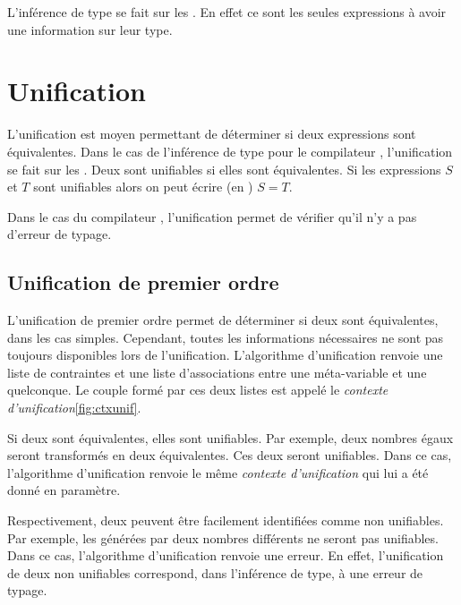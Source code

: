             L'inférence de type se fait sur les \lexp{}. En effet ce sont les seules expressions
            à avoir une information sur leur type.

    \section{Unification}
        L'unification est moyen permettant de déterminer si deux expressions sont équivalentes.
        Dans le cas de l'inférence de type pour le compilateur \typer{},
        l'unification se fait sur les \lexp{}.
        Deux \lexp{} sont unifiables si elles sont équivalentes. Si les expressions $S$ et $T$
        sont unifiables alors on peut écrire (en \typer{}) $S = T$.

        Dans le cas du compilateur \typer{}, l'unification permet de vérifier qu'il n'y a pas
        d'erreur de typage.

    \subsection{Unification de premier ordre}

                L'unification de premier ordre permet de déterminer si deux \lexp{} sont équivalentes, dans les cas simples.
                Cependant, toutes les informations nécessaires ne sont pas toujours disponibles lors de l'unification.
                L'algorithme d'unification renvoie une liste de contraintes et une liste d'associations entre une méta-variable et une \lexp{} quelconque.
                Le couple formé par ces deux listes est appelé le \textit{contexte d'unification}\ref{fig:ctxunif}.

                Si deux \lexp{} sont équivalentes, elles sont unifiables. Par exemple, deux nombres égaux seront transformés en deux \lexp{} équivalentes.
                Ces deux \lexp{} seront unifiables.
                Dans ce cas, l'algorithme d'unification renvoie le même \textit{contexte d'unification} qui lui a été donné en paramètre.

                Respectivement, deux \lexp{} peuvent être facilement identifiées comme non unifiables. Par exemple, les \lexp{} générées par deux nombres différents
                ne seront pas unifiables.
                Dans ce cas, l'algorithme d'unification renvoie une erreur. En effet, l'unification de deux \lexp{} non unifiables correspond,
                dans l'inférence de type, à une erreur de typage.

